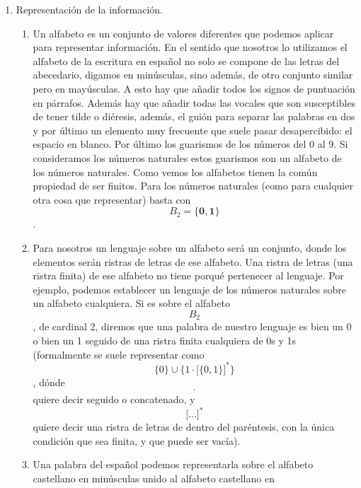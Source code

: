 \begin{enumerate}
\def\labelenumi{\arabic{enumi}.}
\item
  Representación de la información.

  \begin{enumerate}
  \def\labelenumii{\arabic{enumii}.}
  \tightlist
  \item
    Un alfabeto es un conjunto de valores diferentes que podemos aplicar
    para represen\-tar información. En el sentido que nosotros lo
    utilizamos el alfabeto de la escritura en español no solo se compone
    de las letras del abecedario, digamos en minúsculas, sino además, de
    otro conjunto similar pero en mayúsculas. A esto hay que añadir
    todos los signos de puntuación en párrafos. Además hay que añadir
    todas las vocales que son susceptibles de tener tilde o diéresis,
    además, el guión para separar las palabras en dos y por último un
    elemento muy frecuente que suele pasar desapercibido: el espa\-cio
    en blanco. Por último los guarismos de los números del 0 al 9. Si
    consideramos los números naturales estos guarismos son un alfabeto
    de los números naturales. Como vemos los alfabetos tienen la común
    propiedad de ser finitos. Para los núme\-ros naturales (como para
    cualquier otra cosa que representar) basta con
    \[B_{\mathbf{\mathrm{2}}} = {\{{\mathbf{0,}\mathbf{1}}\}}\] .
  \item
    Para nosotros un lenguaje sobre un alfabeto será un conjunto, donde
    los elementos serán ristras de letras de ese alfabeto. Una ristra de
    letras (una ristra finita) de ese al\-fabeto no tiene porqué
    pertenecer al lenguaje. Por ejemplo, podemos establecer un lenguaje
    de los números naturales sobre un alfabeto cualquiera. Si es sobre
    el alfabe\-to \[B_{\mathbf{\mathrm{2}}}\], de cardinal 2, diremos
    que una palabra de nuestro lenguaje es bien un 0 o bien un 1 seguido
    de una ristra finita cualquiera de 0s y 1s (formalmente se suele
    re\-presentar como
    \[{\{ 0\}} \cup {\{{1 \cdot {\lbrack{\{ 0,1\}}\rbrack}^{\ast}}\}}\],
    dónde \textquotesingle{}\[\cdot\]\textquotesingle{} quiere decir
    seguido o conca\-tenado, y
    \textquotesingle\textquotesingle{}\[{\lbrack...\rbrack}^{\ast}\]\textquotesingle\textquotesingle{}
    quiere decir una ristra de letras de dentro del paréntesis, con la
    única condición que sea finita, y que puede ser vacía).
  \item
    Una palabra del español podemos representarla sobre el alfabeto
    castellano en minús\-culas unido al alfabeto castellano en

\end{enumerate}
\end{enumerate}
